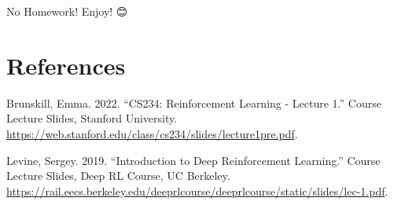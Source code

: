 \documentclass[
  letterpaper,
  DIV=11,
  numbers=noendperiod]{scrreprt}
\newlength{\cslhangindent}
\newenvironment{CSLReferences}[2] %
 {\begin{list}{}{%
  \setlength{\itemindent}{0pt}
  \setlength{\leftmargin}{0pt}
  \setlength{\parsep}{0pt}
  \ifodd #1
   \setlength{\leftmargin}{\cslhangindent}
   \setlength{\itemindent}{-1\cslhangindent}
  \fi
  \setlength{\itemsep}{#2\baselineskip}}}
 {\end{list}}
\begin{document}
\begin{tcolorbox}[enhanced jigsaw, colback=white, left=2mm, breakable, opacityback=0, bottomrule=.15mm, rightrule=.15mm, arc=.35mm, colframe=quarto-callout-note-color-frame, leftrule=.75mm, toprule=.15mm]

No Homework! Enjoy! 😊

\end{tcolorbox}


\chapter*{References}\label{references}


\label{refs}
\begin{CSLReferences}{1}{0}
Brunskill, Emma. 2022. {``CS234: Reinforcement Learning - Lecture 1.''}
Course Lecture Slides, Stanford University.
\url{https://web.stanford.edu/class/cs234/slides/lecture1pre.pdf}.

Levine, Sergey. 2019. {``Introduction to Deep Reinforcement Learning.''}
Course Lecture Slides, Deep RL Course, UC Berkeley.
\url{https://rail.eecs.berkeley.edu/deeprlcourse/deeprlcourse/static/slides/lec-1.pdf}.

\end{CSLReferences}
\end{document}
